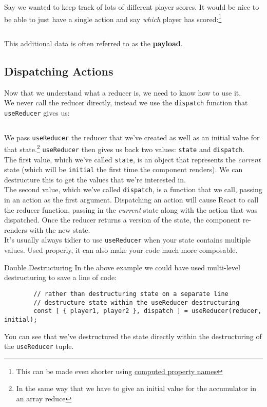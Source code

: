 Say we wanted to keep track of lots of different player scores. It would be nice to be able to just have a single action and say \textit{which} player has scored:\footnote{This can be made even shorter using \href{https://tylermcginnis.com/computed-property-names/}{computed property names}}

\inputminted{js}{05-hooks/figures/07-reducer-payload.js}

This additional data is often referred to as the \textbf{payload}.


\subsection{Dispatching Actions}

Now that we understand what a reducer is, we need to know how to use it.
\\

We never call the reducer directly, instead we use the \texttt{dispatch} function that \texttt{useReducer} gives us:

\inputminted{js}{05-hooks/figures/08-useReducer.js}

We pass \texttt{useReducer} the reducer that we've created as well as an initial value for that state.\footnote{In the same way that we have to give an initial value for the accumulator in an array reduce} \texttt{useReducer} then gives us back two values: \texttt{state} and \texttt{dispatch}.
\\

The first value, which we've called \texttt{state}, is an object that represents the \textit{current} state (which will be \texttt{initial} the first time the component renders). We can destructure this to get the values that we're interested in.
\\

The second value, which we've called \texttt{dispatch}, is a function that we call, passing in an action as the first argument. Dispatching an action will cause React to call the reducer function, passing in the \textit{current} state along with the action that was dispatched. Once the reducer returns a version of the state, the component re-renders with the new state.
\\

It's usually always tidier to use \texttt{useReducer} when your state contains multiple values. Used properly, it can also make your code much more composable.

\begin{infobox}{Double Destructuring}
    In the above example we could have used multi-level destructuring to save a line of code:

    \begin{verbatim}
        // rather than destructuring state on a separate line
        // destructure state within the useReducer destructuring
        const [ { player1, player2 }, dispatch ] = useReducer(reducer, initial);
    \end{verbatim}

    You can see that we've destructured the state directly within the destructuring of the \texttt{useReducer} tuple.
\end{infobox}


